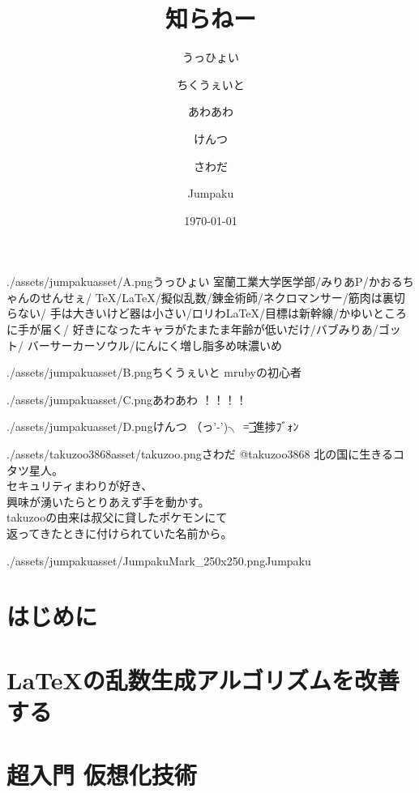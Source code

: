 \documentclass[autodetect-engine,dvipdfmx-if-dvi,ja=standard,a5paper,10.5pt,twoside,openany,layout=v2]{bxjsbook}
\title{知らねー}
\author{うっひょい \and ちくうぇいと \and あわあわ \and けんつ \and さわだ \and Jumpaku}
\date{\today}
\newcommand{\articlepath}{./articles}
\newcommand{\assetspath}{./assets}
\newcommand{\jumpakuasset}{\assetspath/jumpakuasset}
\newcommand{\takuzooasset}{\assetspath/takuzoo3868asset}
\begin{document}
\frontmatter
\maketitle
\begin{myintroduce}{\jumpakuasset/A.png}{うっひょい}
  室蘭工業大学医学部/みりあP/かおるちゃんのせんせぇ/
  TeX/LaTeX/擬似乱数/錬金術師/ネクロマンサー/筋肉は裏切らない/
  手は大きいけど器は小さい/ロリわLaTeX/目標は新幹線/かゆいところに手が届く/
  好きになったキャラがたまたま年齢が低いだけ/バブみりあ/ゴット/
  バーサーカーソウル/にんにく増し脂多め味濃いめ
\end{myintroduce}
\begin{myintroduce}{\jumpakuasset/B.png}{ちくうぇいと}
  mrubyの初心者
\end{myintroduce}
\begin{myintroduce}{\jumpakuasset/C.png}{あわあわ}
  ！！！！
\end{myintroduce}
\begin{myintroduce}{\jumpakuasset/D.png}{けんつ}
  （っ'-')╮ =͟͟͞͞ 進捗ﾌﾞｫﾝ
\end{myintroduce}
\begin{myintroduce}{\takuzooasset/takuzoo.png}{さわだ @takuzoo3868}
    北の国に生きるコタツ星人。\\
    セキュリティまわりが好き、\\
    興味が湧いたらとりあえず手を動かす。\\
    takuzooの由来は叔父に貸したポケモンにて\\
    返ってきたときに付けられていた名前から。
\end{myintroduce}
\begin{myintroduce}{\jumpakuasset/JumpakuMark_250x250.png}{Jumpaku}

\end{myintroduce}

\chapter{はじめに}


\tableofcontents
\mainmatter
{}
\chapter{\LaTeX の乱数生成アルゴリズムを改善する}


\chapter{超入門 仮想化技術}

\end{document}
